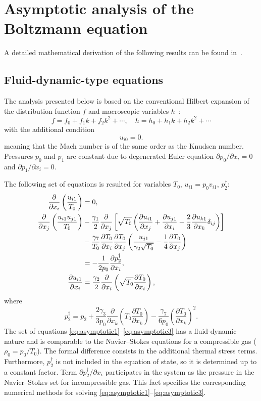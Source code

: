 \documentclass[smallextended, referee]{svjour3} %
\newcommand{\pder}[2][]{\frac{\partial#1}{\partial#2}}
\newcommand{\Pder}[2][]{\partial#1/\partial#2}
\begin{document}
\section{Asymptotic analysis of the Boltzmann equation}

A detailed mathematical derivation of the following results can be found in~\cite{Sone2002, Sone2007}.

\subsection{Fluid-dynamic-type equations}

The analysis presented below is based on the conventional Hilbert expansion
of the distribution function \(f\) and macroscopic variables \(h\)~\cite{Hilbert1912}:
\[ f = f_0 + f_1k + f_2k^2 + \cdots, \quad h = h_0 + h_1k + h_2k^2 + \cdots \]
with the additional condition
\begin{equation}\label{eq:Mach_constraint}
	u_{i0} = 0.
\end{equation}
meaning that the Mach number is of the same order as the Knudsen number.
Pressures \(p_0\) and \(p_1\) are constant due to degenerated Euler equation
\(\Pder[p_0]{x_i} = 0 \) and \(\Pder[p_1]{x_i} = 0 \).

The following set of equations is resulted for variables \(T_0\), \(u_{i1} = p_0v_{i1}\), \(p_2^\dag\):
\begin{align}
	\pder{x_i}\left(\frac{u_{i1}}{T_0}\right) &= 0, \label{eq:asymptotic1} \\
	\pder{x_j}\left(\frac{u_{i1}u_{j1}}{T_0}\right)
		&-\frac{\gamma_1}2\pder{x_j}\left[\sqrt{T_0}\left(
			\pder[u_{i1}]{x_j}+\pder[u_{j1}]{x_i}-\frac23\pder[u_{k1}]{x_k}\delta_{ij}\right
		)\right] \notag\\
		&- \frac{\gamma_7}{T_0}\pder[T_0]{x_i}\pder[T_0]{x_j}\left(\frac{u_{j1}}{\gamma_2\sqrt{T_0}} - \frac{1}4\pder[T_0]{x_j}\right) \notag\\
		&= -\frac1{2p_0}\pder[p_2^\dag]{x_i}, \label{eq:asymptotic2} \\
	\pder[u_{i1}]{x_i} &= \frac{\gamma_2}2\pder{x_i}\left(\sqrt{T_0}\pder[T_0]{x_i}\right), \label{eq:asymptotic3}
\end{align}
where
\[ 
	p_2^\dag = p_2 + 
		\frac{2\gamma_3}{3p_0}\pder{x_k}\left(T_0\pder[T_0]{x_k}\right) -
		\frac{\gamma_7}{6p_0}\left(\pder[T_0]{x_k}\right)^2.
\]
The set of equations \eqref{eq:asymptotic1}--\eqref{eq:asymptotic3} has a fluid-dynamic nature
and is comparable to the Navier--Stokes equations for a compressible gas (\(\rho_0 = p_0/T_0\)).
The formal difference consists in the additional thermal stress terms.
Furthermore, \(p_2^\dag\) is not included in the equation of state,
so it is determined up to a constant factor.
Term \(\partial{p_2 ^ \dag} / \partial{x_i}\) participates in the system as the pressure
in the Navier--Stokes set for incompressible gas.
This fact specifies the corresponding numerical methods for solving \eqref{eq:asymptotic1}--\eqref{eq:asymptotic3}.
\end{document}
